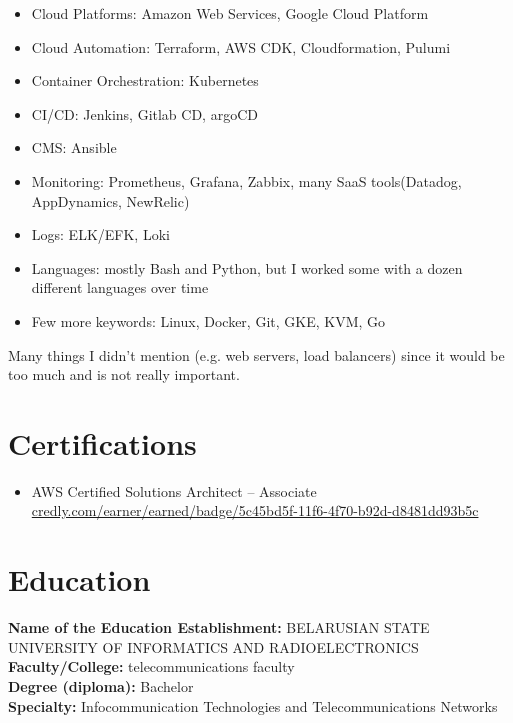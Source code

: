 \documentclass[11pt]{letter}
\newcommand{\forceindent}{\leavevmode{\parindent=1em\indent} %
}
\begin{document}
\begin{itemize}
  \item Cloud Platforms: Amazon Web Services, Google Cloud Platform
  \item Cloud Automation: Terraform, AWS CDK, Cloudformation, Pulumi
  \item Container Orchestration: Kubernetes
  \item CI/CD: Jenkins, Gitlab CD, argoCD
  \item CMS: Ansible
  \item Monitoring: Prometheus, Grafana, Zabbix, many SaaS tools(Datadog, AppDynamics, NewRelic)
  \item Logs: ELK/EFK, Loki
  \item Languages: mostly Bash and Python, but I worked some with a dozen different languages over time
  \item Few more keywords: Linux, Docker, Git, GKE, KVM, Go
\end{itemize}

\forceindent Many things I didn't mention (e.g. web servers, load balancers) since it would be too much and is not really important.

\section*{Certifications\vphantom{certs}}

\begin{itemize}
    \item AWS Certified Solutions Architect – Associate \\
    \href{https://credly.com/earner/earned/badge/5c45bd5f-11f6-4f70-b92d-d8481dd93b5c}{credly.com/earner/earned/badge/5c45bd5f-11f6-4f70-b92d-d8481dd93b5c}
\end{itemize}

\section*{Education\vphantom{edu}}

\textbf{Name of the Education Establishment:} BELARUSIAN STATE UNIVERSITY OF INFORMATICS AND RADIOELECTRONICS \\
\textbf{Faculty/College:} telecommunications faculty \\
\textbf{Degree (diploma):} Bachelor \\
\textbf{Specialty:} Infocommunication Technologies and Telecommunications Networks \\
\end{document}
